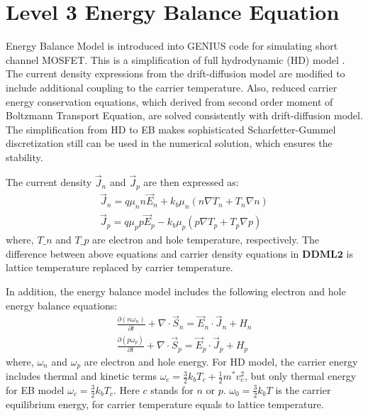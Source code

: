 \section{Level 3 Energy Balance Equation}\label{sec:Equation:EBML3} 
Energy Balance Model \cite{PISCES-2ET} is introduced into GENIUS code for simulating short channel MOSFET. This is a simplification of full hydrodynamic (HD) model \cite{Aste2003}. The current density expressions from the drift-diffusion model are modified to include additional coupling to the carrier temperature. Also, reduced carrier energy conservation equations, which derived from second order moment of Boltzmann Transport Equation, are solved consistently with drift-diffusion model. The simplification from HD to EB makes sophisticated Scharfetter-Gummel discretization still can be used in the numerical solution, which ensures the stability.

The current density $\vec{J}_n$ and $\vec{J}_p$ are then expressed as:
\begin{equation}\begin{array}{l}
 \vec{J}_n  = q\mu_n n \vec{E}_n + k_b \mu_n \left( {n\nabla T_n + T_n \nabla n} \right)  \\
 \vec{J}_p  = q\mu_p p \vec{E}_p - k_b \mu_p \left( {p\nabla T_p + T_p \nabla p} \right)
\end{array}\end{equation}
where, $T\_n$ and $T\_p$ are electron and hole temperature, respectively. The difference between above equations and carrier density equations in $\mathbf{DDML2}$ is lattice temperature replaced by carrier temperature.

In addition, the energy balance model includes the following electron and hole energy balance equations:
\begin{equation}\begin{array}{l}
\displaystyle \frac{\partial \left( {n\omega _n } \right)} {\partial t} + \nabla \cdot \vec{S}_n  = \vec{E}_n \cdot \vec{J}_n +H_n \\
\displaystyle \frac{\partial \left( {p\omega _p } \right)} {\partial t} + \nabla \cdot \vec{S}_p = \vec{E}_p \cdot \vec{J}_p +H_p
\end{array}\end{equation}
where, $\omega _n$ and $\omega _p$ are electron and hole energy. For HD model, the carrier energy includes thermal and kinetic terms $\omega _c =\frac{3}{2}k_bT_c + \frac{1}{2}m^* v_c^2$, but only thermal energy for EB model $\omega _c = \frac{3}{2}k_bT_c$. Here $c$ stands for $n$ or $p$. $\omega_0=\frac{3}{2}k_bT$ is the carrier equilibrium energy, for carrier temperature equals to lattice temperature.


